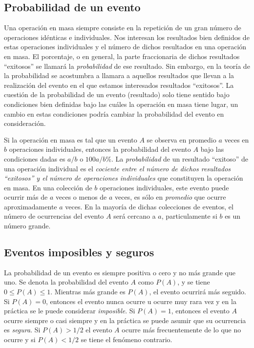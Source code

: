 \subsection{Probabilidad de un evento}

Una operación en masa siempre consiste en la repetición de un gran número de operaciones idénticas e individuales. Nos interesan los resultados bien definidos de estas operaciones individuales y el número de dichos resultados en una operación en masa. El porcentaje, o en general, la parte fraccionaria de dichos resultados ``exitosos'' se llamará la \emph{probabilidad} de ese resultado. Sin embargo, en la teoría de la probabilidad se acostumbra a llamara a aquellos resultados que llevan a la realización del evento en el que estamos interesados resultados ``exitosos''. La cuestión de la probabilidad de un evento (resultado) solo tiene sentido bajo condiciones bien definidas bajo las cuáles la operación en masa tiene lugar, un cambio en estas condiciones podría cambiar la probabilidad del evento en consideración.
\bigskip
{}

Si la operación en masa es tal que un evento $A$ se observa en promedio $a$ veces en $b$ operaciones individuales, entonces la probabilidad del evento $A$ bajo las condiciones dadas es $a/b$ o $100 a/b\%$. La \emph{probabilidad} de un resultado ``exitoso'' de una operación individual es el \emph{cociente entre el número de dichos resultados ``exitosos'' y el número de operaciones individuales} que constituyen la operación en masa. En una colección de $b$ operaciones individuales, este evento puede ocurrir más de $a$ veces o menos de $a$ veces, es sólo en \emph{promedio} que ocurre aproximadamente $a$ veces. En la mayoría de dichas colecciones de eventos, el número de ocurrencias del evento $A$ será cercano a $a$, particulamente si $b$ es un número grande.

\subsection{Eventos imposibles y seguros}

La probabilidad de un evento es siempre positiva o cero y no más grande que uno. Se denota la probabilidad del evento $A$ como $P(A)$, y se tiene $0 \le P(A) \le 1$. Mientras más grande es $P(A)$, el evento ocurrirá más seguido. Si $P(A)=0$, entonces el evento nunca ocurre u ocurre muy rara vez y en la práctica se le puede considerar \emph{imposible}. Si $P(A)=1$, entonces el evento $A$ ocurre siempre o casi siempre y en la práctica se puede asumir que su ocurrencia es \emph{segura}. Si $P(A)>1/2$ el evento $A$ ocurre más frecuentemente de lo que no ocurre y si $P(A)<1/2$ se tiene el fenómeno contrario.
\bigskip

